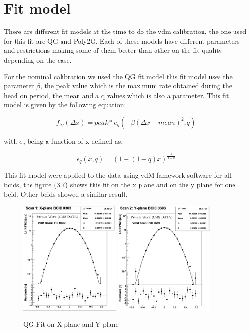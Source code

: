 \section{Fit model} 

There are different fit models at the time to do the vdm calibration, the one used for this fit are QG and Poly2G. Each of these models have different parameters and restrictions making some of them better than other on the fit quality depending on the case. 

For the nominal calibration we used the QG fit model this fit model uses the parameter $\beta$, the peak value which is the maximum rate obtained during the head on period, the mean and a q values which is also a parameter. This fit model is given by the following equation:


\begin{equation}
f_{qg}(\Delta x) = peak * e_{q}(-\beta(\Delta x - mean)^{2},q)
\end{equation}

with $e_{q}$ being a function of x defined as: 

\begin{equation}
e_{q}(x, q) = (1+(1-q)x)^{\frac{1}{1-q}}
\end{equation}

This fit model were applied to the data using vdM famework software for all bcids, the figure (3.7) shows this fit on the x plane and on the y plane for one bcid. Other bcids showed a similar result.

\begin{figure}[H]
    \centering
    \includegraphics[width=0.45\textwidth]{fitqg1.png}
    \includegraphics[width=0.45\textwidth]{fitqg2.png}
    \caption{QG Fit on X plane and Y plane}
    \label{fig:QGfit}
\end{figure}

